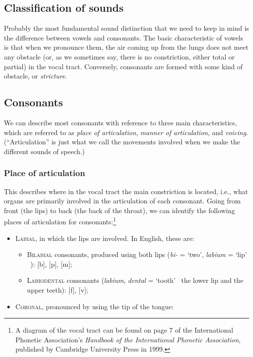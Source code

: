 \begin{refsection}
\section{Classification of sounds}

Probably the most fundamental sound distinction that we need to keep in mind is the difference between vowels and consonants. The basic characteristic of vowels is that when we pronounce them, the air coming up from the lungs does not meet any obstacle (or, as we sometimes say, there is no constriction, either total or partial) in the vocal tract. Conversely, consonants are formed with some kind of obstacle, or \textit{stricture}.

\subsection{Consonants}

We can describe most consonants with reference to three main characteristics, which are referred to as \textit{place of articulation}, \textit{manner of articulation}, and \textit{voicing}. (“Articulation” is just what we call the movements involved when we make the different sounds of speech.)

\subsubsection{Place of articulation}

This describes where in the vocal tract the main constriction is located, i.e., what organs are primarily involved in the articulation of each consonant. Going from front (the lips) to back (the back of the throat), we can identify the following places of articulation for consonants:\footnote{A diagram of the vocal tract can be found on page 7 of the International Phonetic Association's \textit{Handbook of the International Phonetic Association}, published by Cambridge University Press in 1999.}

\begin{itemize}
    \item \textsc{Labial}, in which the lips are involved. In English, these are:
    \begin{itemize}

        \item \textsc{Bilabial} consonants, produced using both lips (\textit{bi-} = `two', \textit{labium} = `lip' \Rightarrow\ ): [{b}], [{p}], [{m}];
        \item \textsc{Labiodental} consonants (\textit{labium}, \textit{dental} = `tooth' \Rightarrow\ the lower lip and the upper teeth): [{f}], [{v}];
    \end{itemize}
    \item \textsc{Coronal}, pronounced by using the tip of the tongue:
    \begin{itemize}


\end{itemize}
\end{itemize}
\end{refsection}
